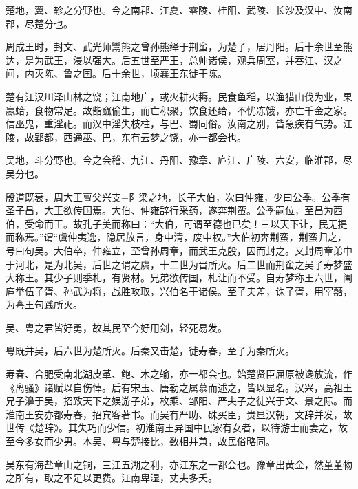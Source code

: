 \documentclass[12pt,UTF8]{ctexbook}
\begin{document}
楚地，翼、轸之分野也。今之南郡、江夏、零陵、桂阳、武陵、长沙及汉中、汝南郡，尽楚分也。



周成王时，封文、武光师鬻熊之曾孙熊绎于荆蛮，为楚子，居丹阳。后十余世至熊达，是为武王，浸以强大。后五世至严王，总帅诸侯，观兵周室，并吞江、汉之间，内灭陈、鲁之国。后十余世，顷襄王东徙于陈。



楚有江汉川泽山林之饶；江南地广，或火耕火耨。民食鱼稻，以渔猎山伐为业，果蠃蛤，食物常足。故啙窳偷生，而亡积聚，饮食还给，不忧冻饿，亦亡千金之家。信巫鬼，重淫祀。而汉中淫失枝柱，与巴、蜀同俗。汝南之别，皆急疾有气势。江陵，故郢都，西通巫、巴，东有云梦之饶，亦一都会也。



吴地，斗分野也。今之会稽、九江、丹阳、豫章、庐江、广陵、六安，临淮郡，尽吴分也。



殷道既衰，周大王亶父兴支+阝梁之地，长子大伯，次曰仲雍，少曰公季。公季有圣子昌，大王欲传国焉。大伯、仲雍辞行采药，遂奔荆蛮。公季嗣位，至昌为西伯，受命而王。故孔子美而称曰：“大伯，可谓至德也已矣！三以天下让，民无提而称焉。”谓“虞仲夷逸，隐居放言，身中清，废中权。”大伯初奔荆蛮，荆蛮归之，号曰句吴。大伯卒，仲雍立，至曾孙周章，而武王克殷，因而封之。又封周章弟中于河北，是为北吴，后世之谓之虞，十二世为晋所灭。后二世而荆蛮之吴子寿梦盛大称王。其少子则季札，有贤材。兄弟欲传国，札让而不受。自寿梦称王六世，阖庐举伍子胥、孙武为将，战胜攻取，兴伯名于诸侯。至子夫差，诛子胥，用宰嚭，为粤王句践所灭。



吴、粤之君皆好勇，故其民至今好用剑，轻死易发。



粤既并吴，后六世为楚所灭。后秦又击楚，徙寿春，至子为秦所灭。



寿春、合肥受南北湖皮革、鲍、木之输，亦一都会也。始楚贤臣屈原被谗放流，作《离骚》诸赋以自伤悼。后有宋玉、唐勒之属慕而述之，皆以显名。汉兴，高祖王兄子濞于吴，招致天下之娱游子弟，枚乘、邹阳、严夫子之徒兴于文、景之际。而淮南王安亦都寿春，招宾客著书。而吴有严助、硃买臣，贵显汉朝，文辞并发，故世传《楚辞》。其失巧而少信。初淮南王异国中民家有女者，以待游士而妻之，故至今多女而少男。本吴、粤与楚接比，数相并兼，故民俗略同。



吴东有海盐章山之铜，三江五湖之利，亦江东之一都会也。豫章出黄金，然堇堇物之所有，取之不足以更费。江南卑湿，丈夫多夭。
\end{document}
